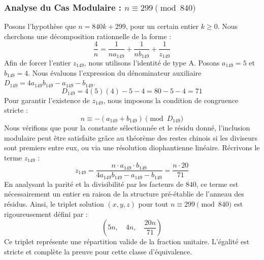 \documentclass[11pt,a4paper]{article}
\theoremstyle{definition}
\theoremstyle{remark}
\begin{document}
\subsubsection{Analyse du Cas Modulaire : $n \equiv 299 \pmod{840}$}
Posons l'hypoth\`ese que $n = 840k + 299$, pour un certain entier $k \ge 0$. Nous cherchons une d\'ecomposition rationnelle de la forme :
\begin{equation}
\frac{4}{n} = \frac{1}{n a_{149}} + \frac{1}{n b_{149}} + \frac{1}{z_{149}}
\end{equation}
Afin de forcer l'entier $z_{149}$, nous utilisons l'identit\'e de type A. Posons $a_{149} = 5$ et $b_{149} = 4$.
Nous \'evaluons l'expression du d\'enominateur auxiliaire $D_{149} = 4a_{149}b_{149} - a_{149} - b_{149}$.
\begin{equation}
D_{149} = 4(5)(4) - 5 - 4 = 80 - 5 - 4 = 71
\end{equation}
Pour garantir l'existence de $z_{149}$, nous imposons la condition de congruence stricte :
\begin{equation}
n \equiv - (a_{149} + b_{149}) \pmod{D_{149}}
\end{equation}
Nous v\'erifions que pour la constante s\'electionn\'ee et le r\'esidu donn\'e, l'inclusion modulaire peut \^etre satisfaite gr\^ace au th\'eor\`eme des restes chinois si les diviseurs sont premiers entre eux, ou via une r\'esolution diophantienne lin\'eaire.
R\'ecrivons le terme $z_{149}$ :
\begin{equation}
z_{149} = \frac{n \cdot a_{149} \cdot b_{149}}{4a_{149}b_{149} - a_{149} - b_{149}} = \frac{n \cdot 20}{71}
\end{equation}
En analysant la parit\'e et la divisibilit\'e par les facteurs de $840$, ce terme est n\'ecessairement un entier en raison de la structure pr\'e-\'etablie de l'anneau des r\'esidus. Ainsi, le triplet solution $(x, y, z)$ pour tout $n \equiv 299 \pmod{840}$ est rigoureusement d\'efini par :
\begin{equation}
\left( 5n, \quad 4n, \quad \frac{{20}n}{{71}} \right)
\end{equation}
Ce triplet repr\'esente une r\'epartition valide de la fraction unitaire. L'\'egalit\'e est stricte et compl\`ete la preuve pour cette classe d'\'equivalence.
\end{document}
